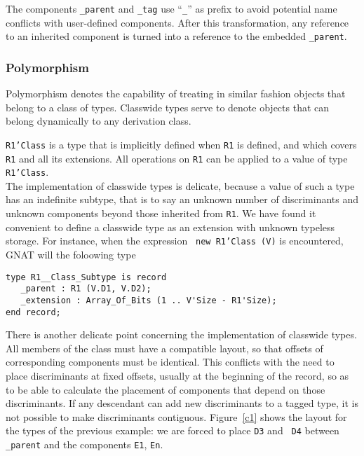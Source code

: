 The components {\tt \_parent} and {\tt \_tag} use ``{\tt \_}'' as prefix
to avoid potential name conflicts with user-defined components.
After this transformation,  any reference to an inherited component is
turned into a reference to the embedded {\tt \_parent}. 

\subsubsection{Polymorphism}
Polymorphism denotes the capability of treating in similar
fashion objects that belong to a class of types. Classwide types
serve to denote objects that can belong dynamically to any derivation class. 

{\tt R1'Class} is  a type that is implicitly defined when {\tt R1} is defined,
and which covers {\tt R1} and all its extensions. All operations on
{\tt R1} can be applied to a value of type {\tt R1'Class}.
\\ The implementation of classwide types is delicate, because a value of such
a type has an indefinite subtype, that is to say an unknown number of
discriminants and unknown components beyond those inherited from {\tt R1}.
We have found it convenient to define a classwide type as an extension with
unknown typeless storage. For instance, when the expression {\tt
new R1'Class (V)} is encountered,   GNAT will the foloowing type

\begin{center}
\begin{minipage}{4in}
\begin{verbatim}
type R1__Class_Subtype is record
   _parent : R1 (V.D1, V.D2);
   _extension : Array_Of_Bits (1 .. V'Size - R1'Size);
end record;
\end{verbatim}
\end{minipage}
\end{center}
 
There is another delicate point concerning the implementation of classwide
types. All members of the class must have a compatible layout,  so that
offsets of corresponding components must be identical. This conflicts with
the need to place discriminants at fixed offsets,  usually at the beginning
of the record,  so as to be able to calculate the placement of components
that depend on those discriminants. If any descendant can add new discriminants
to a tagged type,  it is not possible to make discriminants contiguous. 
Figure~\ref{c1} shows the layout for the types of the previous example:
we are forced to place {\tt D3} and {\tt
D4} between {\tt \_parent} and the components {\tt E1}, {\tt En}.

